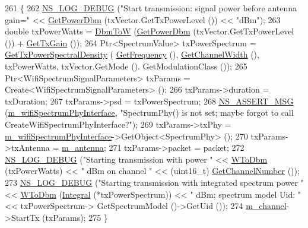 \begin{DoxyCode}
261 \{
262   \hyperlink{group__logging_ga413f1886406d49f59a6a0a89b77b4d0a}{NS\_LOG\_DEBUG} (\textcolor{stringliteral}{"Start transmission: signal power before antenna gain="} << 
      \hyperlink{classns3_1_1WifiPhy_a91fbc9ea51bb2ac6114cad1f70e25af0}{GetPowerDbm} (txVector.GetTxPowerLevel ()) << \textcolor{stringliteral}{"dBm"});
263   \textcolor{keywordtype}{double} txPowerWatts = \hyperlink{namespacens3_a0a3361f0554b892e3c6389256f5429b7}{DbmToW} (\hyperlink{classns3_1_1WifiPhy_a91fbc9ea51bb2ac6114cad1f70e25af0}{GetPowerDbm} (txVector.GetTxPowerLevel ()) + 
      \hyperlink{classns3_1_1WifiPhy_a02ecf17945090f27057353bc5784f035}{GetTxGain} ());
264   Ptr<SpectrumValue> txPowerSpectrum = \hyperlink{classns3_1_1SpectrumWifiPhy_a36d579959efb946f0ebb3725c3b9ae47}{GetTxPowerSpectralDensity} (
      \hyperlink{classns3_1_1WifiPhy_ad2508d94faf22d690d6b8b4367934fd1}{GetFrequency} (), \hyperlink{classns3_1_1WifiPhy_a4a5d5009b3b3308f2baeed42a2007189}{GetChannelWidth} (), txPowerWatts, txVector.GetMode ().
      GetModulationClass ());
265   Ptr<WifiSpectrumSignalParameters> txParams = Create<WifiSpectrumSignalParameters> ();
266   txParams->duration = txDuration;
267   txParams->psd = txPowerSpectrum;
268   \hyperlink{assert_8h_aff5ece9066c74e681e74999856f08539}{NS\_ASSERT\_MSG} (\hyperlink{classns3_1_1SpectrumWifiPhy_a8d4073a351a848f0a58bf05e83970564}{m\_wifiSpectrumPhyInterface}, \textcolor{stringliteral}{"SpectrumPhy() is not
       set; maybe forgot to call CreateWifiSpectrumPhyInterface?"});
269   txParams->txPhy = \hyperlink{classns3_1_1SpectrumWifiPhy_a8d4073a351a848f0a58bf05e83970564}{m\_wifiSpectrumPhyInterface}->GetObject<SpectrumPhy> ();
270   txParams->txAntenna = \hyperlink{classns3_1_1SpectrumWifiPhy_a54db14b60533b3c2d82f1b001eb17d6c}{m\_antenna};
271   txParams->packet = packet;
272   \hyperlink{group__logging_ga413f1886406d49f59a6a0a89b77b4d0a}{NS\_LOG\_DEBUG} (\textcolor{stringliteral}{"Starting transmission with power "} << \hyperlink{namespacens3_a256abf4ba6bab6e20f8419fff00e73e2}{WToDbm} (txPowerWatts) << \textcolor{stringliteral}{" dBm on
       channel "} << (uint16\_t) \hyperlink{classns3_1_1WifiPhy_a5cf0ccf06109ace61db51c83e91b7e8d}{GetChannelNumber} ());
273   \hyperlink{group__logging_ga413f1886406d49f59a6a0a89b77b4d0a}{NS\_LOG\_DEBUG} (\textcolor{stringliteral}{"Starting transmission with integrated spectrum power "} << 
      \hyperlink{namespacens3_a256abf4ba6bab6e20f8419fff00e73e2}{WToDbm} (\hyperlink{namespacens3_a3dd3817567502f8bc77b04e47134c070}{Integral} (*txPowerSpectrum)) << \textcolor{stringliteral}{" dBm; spectrum model Uid: "} << txPowerSpectrum->
      GetSpectrumModel ()->GetUid ());
274   \hyperlink{classns3_1_1SpectrumWifiPhy_a43a85d339058e0e48a1932cbf60650b0}{m\_channel}->StartTx (txParams);
275 \}
\end{DoxyCode}


